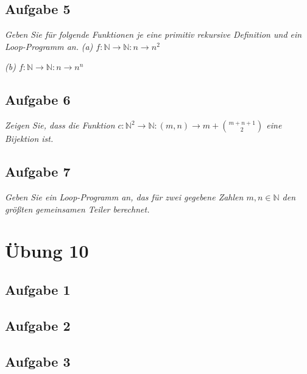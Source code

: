 \documentclass[a4paper]{article}
\begin{document}
\subsection{Aufgabe 5}
\textit{Geben Sie für folgende Funktionen je eine primitiv rekursive Definition und ein Loop-Programm an.}
\textit{(a) $f:\mathbb{N}\rightarrow\mathbb{N}: n\rightarrow n^2$}

\textit{(b) $f:\mathbb{N}\rightarrow\mathbb{N}: n\rightarrow n^n$}


\subsection{Aufgabe 6}
\textit{Zeigen Sie, dass die Funktion $c:\mathbb{N}^2 \rightarrow\mathbb{N}: (m, n) \rightarrow m + \binom{m + n + 1}{2}$ eine Bijektion ist.}


\subsection{Aufgabe 7}
\textit{Geben Sie ein Loop-Programm an, das für zwei gegebene Zahlen $m, n \in\mathbb{N}$ den größten gemeinsamen Teiler berechnet.}




\newpage
\section{Übung 10}
\subsection{Aufgabe 1}
\textit{}

\subsection{Aufgabe 2}
\textit{}


\subsection{Aufgabe 3}
\textit{}




\newpage
\end{document}
